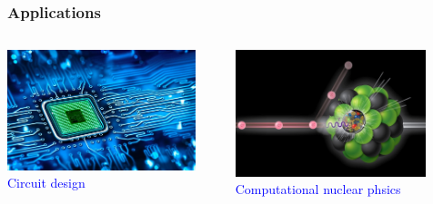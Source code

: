 \documentclass[slidestop,mathserif,xcolor=dvipsnames]{beamer}
\newcommand{\blue}[1]{\textcolor{blue}{#1}}
\begin{document}
\begin{frame}
    \frametitle{Applications}
    \begin{columns}[T]
\begin{column}{0.34\textwidth}
\begin{center}
    \includegraphics[width = 0.9\textwidth]{circuit.jpeg}
    \\\blue{Circuit design}
\end{center}
\end{column}
\begin{column}{0.33\textwidth}  %
    \begin{center}
     \includegraphics[width=0.9\textwidth]{cp.jpg}\\
     \blue{Computational nuclear phsics}
     \end{center}
\end{column}
\begin{column}{0.29\textwidth}  %
    \begin{center}

\end{center}
\end{column}
\end{columns}
\end{frame}
\end{document}
